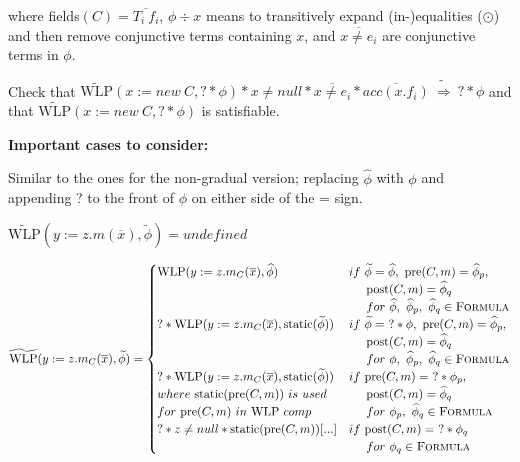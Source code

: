 \documentclass {article}
\newcommand{\fphi}{\widehat{\phi}}
\newcommand{\tphi}{\widetilde{\phi}}
\newcommand{\timp}{\ \widetilde{\Rightarrow}\ }
\newcommand{\pre}{\text{pre}(C,m)}
\newcommand{\post}{\text{post}(C,m)}
\newcommand{\wlp}[2]{\text{WLP}(#1,#2)}
\newcommand{\twlp}[2]{\widetilde{\text{WLP}}(#1,#2)}
\newcommand{\formuladef}{\textsc{Formula}}
\begin{document}
where fields$(C) = \overline{T_i \ f_i}$, $\phi \div x$ means to transitively expand (in-)equalities ($\odot$) and then remove conjunctive terms containing $x$, and $\overline{x \neq e_i}$ are conjunctive terms in $\phi$. 

Check that $\twlp{x := new\ C}{? \ast \phi} \ast x \neq null \ast \overline{x \neq e_i} \ast \overline{acc(x.f_i)} \timp ? \ast \phi$ and that $\twlp{x := new\ C}{? \ast \phi}$ is satisfiable.

\textbf{Important cases to consider:}

Similar to the ones for the non-gradual version; replacing $\fphi$ with $\phi$ and appending ? to the front of $\phi$ on either side of the = sign.

\vspace{0.5cm}

$\twlp{y := z.m(\overline{x})}{\tphi} = undefined$

\vspace{0.5cm}

$\twlp{y := z.m_C(\overline{x})}{\tphi} = 
	\begin{cases}
		\wlp{y := z.m_C(\overline{x})}{\fphi} & if \ \tphi = \fphi, \ \pre = \fphi_p, \\
		& \hspace{0.5cm} \post = \fphi_q \\
		& \hspace{0.5cm} for \ \fphi, \ \fphi_p, \ \fphi_q \in \formuladef \\
	? \ast \wlp{y := z.m_C(\overline{x})}{\text{static}(\tphi)} & if \ \tphi = \ ? \ast \phi, \ \pre = \fphi_p, \\
		& \hspace{0.5cm} \post = \fphi_q \\ 
		& \hspace{0.5cm} for \ \phi, \ \fphi_p, \ \fphi_q \in \formuladef \\
	? \ast \wlp{y := z.m_C(\overline{x})}{\text{static}(\tphi)} & if \ \pre = \ ? \ast \phi_p,\\
	where \ \text{static}(\pre) \ is \ used	& \hspace{0.5cm} \post = \fphi_q \\
	for \ \pre \ in \ \text{WLP} \ comp & \hspace{0.5cm} for \ \phi_p, \ \fphi_q \in \formuladef \\
	? \ast z \neq null \ast \text{static}(\pre)[...]& if \ \post = \ ? \ast \phi_q \\
	 & \hspace{0.5cm} for \ \phi_q \in \formuladef
	\end{cases}
$
\end{document}
